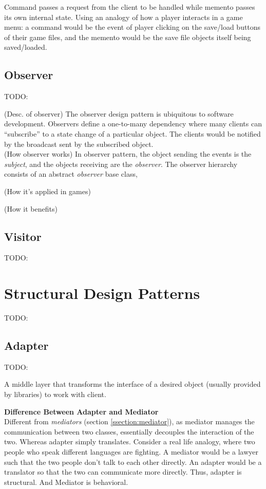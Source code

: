 \documentclass[10pt,letterpaper]{article}
\newcommand{\bs}{\bigskip}
\begin{document}
\begin{multicols}{2}
Command passes a request from the client to be handled while memento passes its own internal state. Using an analogy of how a player interacts in a game menu: a command would be the event of player clicking on the save/load buttons of their game files, and the memento would be the save file objects itself being saved/loaded.\bs
\\

\subsection{Observer}
TODO:

(Desc. of observer)
The observer design pattern is ubiquitous to software development. Observers define a one-to-many dependency where many clients can ``subscribe'' to a state change of a particular object. The clients would be notified by the broadcast sent by the subscribed object.\bs
\\
(How observer works)
In observer pattern, the object sending the events is the \textit{subject}, and the objects receiving are the \textit{observer}. The observer hierarchy  consists of an abstract \textit{observer} base class,


(How it's applied in games)

(How it benefits)

\subsection{Visitor}
TODO:

\section{Structural Design Patterns}
TODO:

\subsection{Adapter}
TODO:

A middle layer that transforms the interface of a desired object (usually provided by libraries) to work with client.

\textbf{Difference Between Adapter and Mediator}\bs
\\

Different from \textit{mediators} (section \ref{ssection:mediator}), as mediator manages the communication between two classes, essentially decouples the interaction of the two. Whereas adapter simply translates.
\bs
Consider a real life analogy, where two people who speak different languages are fighting. A mediator would be a lawyer such that the two people don't talk to each other directly. An adapter would be a translator so that the two can communicate more directly.
\bs
Thus, adapter is structural. And Mediator is behavioral.


\end{multicols}
\end{document}
